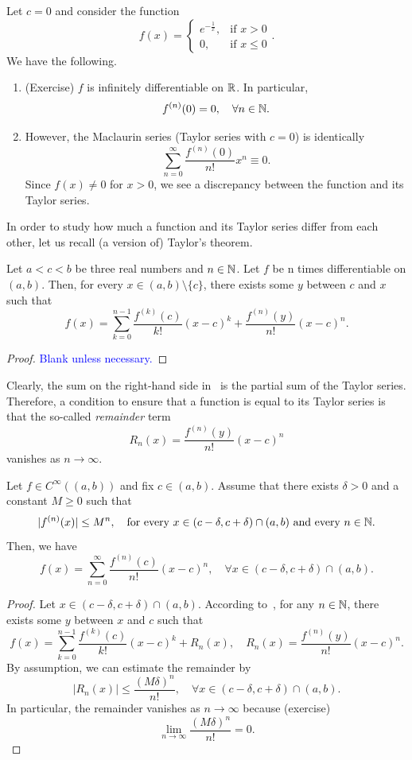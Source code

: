 \begin{eg}
	Let $c=0$ and consider the function
	\[
	f(x) = \left\{
	\begin{array}{cl}
		e^{-\frac{1}{x}}, 	&\text{if }x>0 	\\
		0, 	&\text{if }x\le 0
	\end{array}
	\right..
	\]
	We have the following.
	\begin{enumerate}
		\item (Exercise) $f$ is infinitely differentiable on $\mathbb{R}$. In particular,
		\[
		f^{(n)}(0) = 0,\quad \forall n\in\mathbb{N}.
		\]
		\item However, the Maclaurin series (Taylor series with $c=0$) is identically
		\[
		\sum_{n=0}^\infty \frac{f^{(n)}(0)}{n!}x^n \equiv 0.
		\]
		Since $f(x) \neq 0$ for $x>0$, we see a discrepancy between the function and its Taylor series.
	\end{enumerate}
\end{eg}
In order to study how much a function and its Taylor series differ from each other, let us recall (a version of) Taylor's theorem.
\begin{thm}
	\label{thm:taylor}
	Let $a<c<b$ be three real numbers and $n\in\mathbb{N}$. Let $f$ be n times differentiable on $(a,b)$. Then, for every $x\in(a,b)\setminus\{c\}$, there exists some $y$ between $c$ and $x$ such that
	\[
	f(x) = \sum_{k=0}^{n-1}\frac{f^{(k)}(c)}{k!}(x-c)^k + \frac{f^{(n)}(y)}{n!}(x-c)^n.
	\]
\end{thm}
\begin{proof}
	\textcolor{blue}{Blank unless necessary.}
\end{proof}
Clearly, the sum on the right-hand side in~ is the partial sum of the Taylor series. Therefore, a condition to ensure that a function is equal to its Taylor series is that the so-called \textit{remainder} term
\[
R_n(x) = \frac{f^{(n)}(y)}{n!}(x-c)^n
\]
vanishes as $n\to \infty$.
\begin{thm}
	\label{thm:taylor_eq}
	Let $f\in C^\infty((a,b))$ and fix $c\in (a,b)$. Assume that there exists $\delta>0$ and a constant $M\ge 0$ such that
	\[
	|f^{(n)}(x)|\le M^n,\quad \text{for every }x\in (c-\delta,c+\delta)\cap (a,b)\text{ and every }n\in\mathbb{N}.
	\]
	Then, we have
	\[
	f(x) = \sum_{n=0}^\infty \frac{f^{(n)}(c)}{n!}(x-c)^n,\quad \forall x\in (c-\delta,c+\delta)\cap (a,b).
	\]
\end{thm}
\begin{proof}
	Let $x\in (c-\delta,c+\delta)\cap (a,b)$. According to~, for any $n\in\mathbb{N}$, there exists some $y$ between $x$ and $c$ such that
	\[
	f(x) = \sum_{k=0}^{n-1}\frac{f^{(k)}(c)}{k!}(x-c)^k + R_n(x),\quad R_n(x) = \frac{f^{(n)}(y)}{n!}(x-c)^n.
	\]
	By assumption, we can estimate the remainder by
	\[
	\left|R_n(x)\right|\le \frac{(M\delta)^n}{n!},\quad\forall x\in (c-\delta,c+\delta)\cap (a,b).
	\]
	In particular, the remainder vanishes as $n\to \infty$ because (exercise)
	\[
	\lim_{n\to\infty}\frac{(M\delta)^n}{n!} = 0.
	\]
\end{proof}